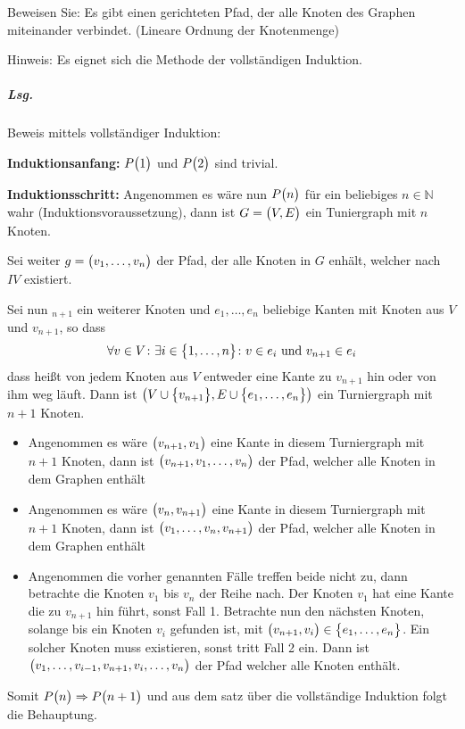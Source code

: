 \documentclass{scrreprt}
\begin{document}
Beweisen Sie: Es gibt einen gerichteten Pfad, der alle Knoten des Graphen
miteinander verbindet.
(Lineare Ordnung der Knotenmenge)

\begin{small}
  Hinweis: Es eignet sich die Methode der vollständigen Induktion.
\end{small}

\subparagraph{Lsg.} Beweis mittels vollständiger Induktion:

\textbf{Induktionsanfang:} $P\qty\big(1)$ und $P\qty\big(2)$ sind trivial.

\textbf{Induktionsschritt:} Angenommen es wäre nun $P\qty\big(n)$ für ein
beliebiges $n \in \mathbb{N}$ wahr (Induktionsvoraussetzung), dann ist
$G = \qty\big(V, E)$ ein Tuniergraph mit $n$ Knoten.

Sei weiter $g = \qty\big(v_1, \ldots, v_n)$ der Pfad, der alle Knoten in $G$
enhält, welcher nach $IV$ existiert.

Sei nun $_{n + 1}$ ein weiterer Knoten und $e_1, \ldots, e_n$ beliebige Kanten mit
Knoten aus $V$ und $v_{n + 1}$, so dass
\[
  \forall v \in V \colon \exists i \in \qty\big{1, \ldots, n} \colon v \in e_i \text{ und } v_{n + 1} \in e_i
\]
dass heißt von jedem Knoten aus $V$ entweder eine Kante zu $v_{n + 1}$ hin oder
von ihm weg läuft.
Dann ist
$\qty\big(V \cup \qty\big{v_{n + 1}}, E \cup \qty\big{e_1, \ldots, e_n})$
ein Turniergraph mit $n + 1$ Knoten.


\begin{itemize}
\item Angenommen es wäre $\qty\big(v_{n + 1}, v_1)$ eine Kante in diesem
  Turniergraph mit $n + 1$ Knoten, dann ist
  $\qty\big(v_{n + 1}, v_1, \ldots, v_n)$ der Pfad, welcher alle Knoten in dem
  Graphen enthält
\item Angenommen es wäre $\qty\big(v_n, v_{n + 1})$ eine Kante in diesem
  Turniergraph mit $n + 1$ Knoten, dann ist
  $\qty\big(v_1, \ldots, v_n, v_{n + 1})$ der Pfad, welcher alle Knoten in dem
  Graphen enthält
\item Angenommen die vorher genannten Fälle treffen beide nicht zu, dann
  betrachte die Knoten $v_1$ bis $v_n$ der Reihe nach.
  Der Knoten $v_1$ hat eine Kante die zu $v_{n + 1}$ hin führt, sonst Fall 1.
  Betrachte nun den nächsten Knoten, solange bis ein Knoten $v_i$ gefunden ist,
  mit $\qty\big(v_{n + 1}, v_i) \in \qty\big{e_1, \ldots, e_n}$.
  Ein solcher Knoten muss existieren, sonst tritt Fall 2 ein.
  Dann ist $\qty\big(v_1, \ldots, v_{i - 1}, v_{n + 1}, v_i, \ldots, v_n)$ der
  Pfad welcher alle Knoten enthält.
\end{itemize}
Somit $P\qty\big(n) \Rightarrow P\qty\big(n + 1)$ und aus dem satz über die
vollständige Induktion folgt die Behauptung.
\end{document}
